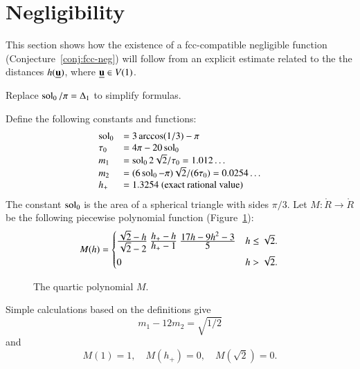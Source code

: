 \section{Negligibility}

This section shows how the existence of a fcc-compatible negligible function (Conjecture~\ref{conj:fcc-neg}) will follow from an explicit estimate
related to the the distances $h({\underline{{\mathbf u}}})$, where ${\underline{{\mathbf u}}}\in V(1)$.

\begin{note}%
Replace $\operatorname{sol}_0/\pi =\Delta_1$ to simplify formulas.
\end{note}

Define the following constants and functions: 
$$
\begin{array}{lll}
\sol_0 &= 3\arccos(1/3)-\pi\\
\tau_0 &= 4\pi  - 20\sol_0\\
m_1 &= \sol_0 2\sqrt2/\tau_0 = 1.012\ldots \\ %
m_2  &=  (6\sol_0- \pi)\sqrt2/(6 \tau_0) = 0.0254\ldots\\ %
h_+ &= 1.3254 \hbox{~(exact rational value)}
\end{array}
$$
The constant $\operatorname{sol}_0$
is the area of a spherical triangle with sides $\pi/3$.
Let $M:\ring{R}\to\ring{R}$ 
be the following piecewise polynomial function (Figure~\ref{fig:M}):
$$
M(h) =
\begin{cases}
\dfrac{\sqrt2-h}{\sqrt2-2}~ \dfrac{h_+-h}{h_+-1} ~\dfrac{17 h - 9 h^2 - 3}{5} & h \le \sqrt2.\vspace{3pt} \\
 0 & h >\sqrt2.
\end{cases}
\\
$$
\begin{figure}[htb]
  \centering
  \caption{The quartic polynomial $M$.}
  \label{fig:M}
\end{figure}

Simple calculations based on the definitions give
\begin{equation}\label{eqn:km}m_1 - 12m_2 = \sqrt{1/2}\end{equation}
and
\begin{equation}M(1) = 1,\quad M(h_+)=0,\quad M(\sqrt2) =0.\end{equation}


